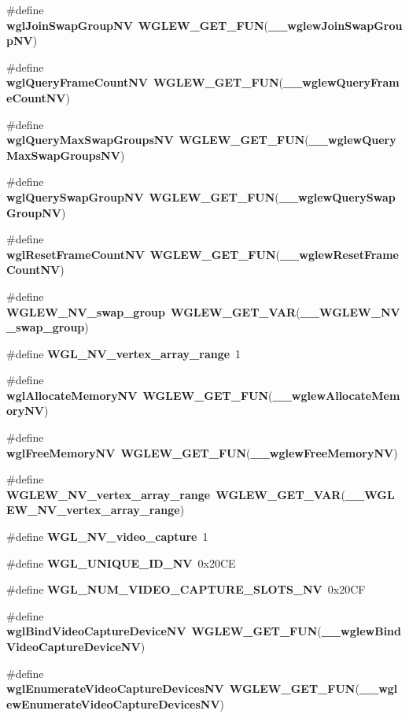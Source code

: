 \begin{DoxyCompactItemize}
\#define {\bf wgl\+Join\+Swap\+Group\+NV}~{\bf W\+G\+L\+E\+W\+\_\+\+G\+E\+T\+\_\+\+F\+UN}({\bf \+\_\+\+\_\+wglew\+Join\+Swap\+Group\+NV})
\item 
\#define {\bf wgl\+Query\+Frame\+Count\+NV}~{\bf W\+G\+L\+E\+W\+\_\+\+G\+E\+T\+\_\+\+F\+UN}({\bf \+\_\+\+\_\+wglew\+Query\+Frame\+Count\+NV})
\item 
\#define {\bf wgl\+Query\+Max\+Swap\+Groups\+NV}~{\bf W\+G\+L\+E\+W\+\_\+\+G\+E\+T\+\_\+\+F\+UN}({\bf \+\_\+\+\_\+wglew\+Query\+Max\+Swap\+Groups\+NV})
\item 
\#define {\bf wgl\+Query\+Swap\+Group\+NV}~{\bf W\+G\+L\+E\+W\+\_\+\+G\+E\+T\+\_\+\+F\+UN}({\bf \+\_\+\+\_\+wglew\+Query\+Swap\+Group\+NV})
\item 
\#define {\bf wgl\+Reset\+Frame\+Count\+NV}~{\bf W\+G\+L\+E\+W\+\_\+\+G\+E\+T\+\_\+\+F\+UN}({\bf \+\_\+\+\_\+wglew\+Reset\+Frame\+Count\+NV})
\item 
\#define {\bf W\+G\+L\+E\+W\+\_\+\+N\+V\+\_\+swap\+\_\+group}~{\bf W\+G\+L\+E\+W\+\_\+\+G\+E\+T\+\_\+\+V\+AR}({\bf \+\_\+\+\_\+\+W\+G\+L\+E\+W\+\_\+\+N\+V\+\_\+swap\+\_\+group})
\item 
\#define {\bf W\+G\+L\+\_\+\+N\+V\+\_\+vertex\+\_\+array\+\_\+range}~1
\item 
\#define {\bf wgl\+Allocate\+Memory\+NV}~{\bf W\+G\+L\+E\+W\+\_\+\+G\+E\+T\+\_\+\+F\+UN}({\bf \+\_\+\+\_\+wglew\+Allocate\+Memory\+NV})
\item 
\#define {\bf wgl\+Free\+Memory\+NV}~{\bf W\+G\+L\+E\+W\+\_\+\+G\+E\+T\+\_\+\+F\+UN}({\bf \+\_\+\+\_\+wglew\+Free\+Memory\+NV})
\item 
\#define {\bf W\+G\+L\+E\+W\+\_\+\+N\+V\+\_\+vertex\+\_\+array\+\_\+range}~{\bf W\+G\+L\+E\+W\+\_\+\+G\+E\+T\+\_\+\+V\+AR}({\bf \+\_\+\+\_\+\+W\+G\+L\+E\+W\+\_\+\+N\+V\+\_\+vertex\+\_\+array\+\_\+range})
\item 
\#define {\bf W\+G\+L\+\_\+\+N\+V\+\_\+video\+\_\+capture}~1
\item 
\#define {\bf W\+G\+L\+\_\+\+U\+N\+I\+Q\+U\+E\+\_\+\+I\+D\+\_\+\+NV}~0x20\+CE
\item 
\#define {\bf W\+G\+L\+\_\+\+N\+U\+M\+\_\+\+V\+I\+D\+E\+O\+\_\+\+C\+A\+P\+T\+U\+R\+E\+\_\+\+S\+L\+O\+T\+S\+\_\+\+NV}~0x20\+CF
\item 
\#define {\bf wgl\+Bind\+Video\+Capture\+Device\+NV}~{\bf W\+G\+L\+E\+W\+\_\+\+G\+E\+T\+\_\+\+F\+UN}({\bf \+\_\+\+\_\+wglew\+Bind\+Video\+Capture\+Device\+NV})
\item 
\#define {\bf wgl\+Enumerate\+Video\+Capture\+Devices\+NV}~{\bf W\+G\+L\+E\+W\+\_\+\+G\+E\+T\+\_\+\+F\+UN}({\bf \+\_\+\+\_\+wglew\+Enumerate\+Video\+Capture\+Devices\+NV})

\end{DoxyCompactItemize}
